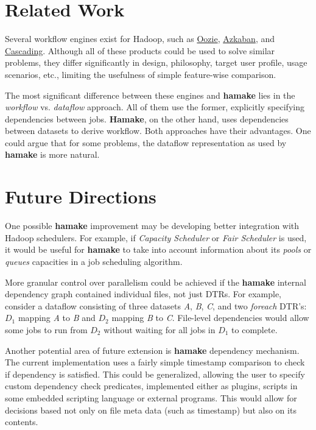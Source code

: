 \documentclass[10pt,conference,letterpaper]{IEEEtran}
\begin{document}
\section{Related Work}

Several workflow engines exist for Hadoop, such as
\href{http://github.com/tucu00/oozie1}{Oozie},
\href{http://sna-projects.com/azkaban/}{Azkaban}, and
\href{http://www.cascading.org/}{Cascading}.  Although all of these
products could be used to solve similar problems, they differ
significantly in design, philosophy, target user profile, usage
scenarios, etc., limiting the usefulness of simple feature-wise
comparison.

The most significant difference between these engines and \textbf{hamake}
lies in the \textit{workflow} vs. \textit{dataflow} approach. All of them
use the former, explicitly specifying dependencies between
jobs. \textbf{Hamake}, on the other hand, uses dependencies between datasets
to derive workflow. Both approaches have their advantages. One
could argue that for some problems, the dataflow representation as used by
\textbf{hamake} is more natural.

\section{Future Directions}

One possible \textbf{hamake} improvement may be developing better integration with
Hadoop schedulers. For example, if \textit{Capacity Scheduler} or
\textit{Fair Scheduler} is used, it would be useful for \textbf{hamake} to take into account
information about its \textit{pools} or \textit{queues} capacities in a
job scheduling algorithm.

More granular control over parallelism could be achieved if the
\textbf{hamake} internal dependency graph contained individual
files, not just DTRs. For example, consider a dataflow consisting of
three datasets \textit{A}, \textit{B}, \textit{C}, and two
\emph{foreach} DTR's: \textit{$D_1$} mapping \textit{A} to \textit{B}
and \textit{$D_2$} mapping \textit{B} to \textit{C}. File-level
dependencies would allow some jobs to run from \textit{$D_2$}
without waiting for all jobs in \textit{$D_1$} to complete.

Another potential area of future extension is \textbf{hamake} dependency
mechanism. The current implementation uses a fairly simple timestamp
comparison to check if dependency is satisfied. This could be
generalized, allowing the user to specify custom dependency check
predicates, implemented either as plugins, scripts in some embedded
scripting language or external programs. This would allow for
decisions based not only on file meta data (such as timestamp) but
also on its contents.
\end{document}
